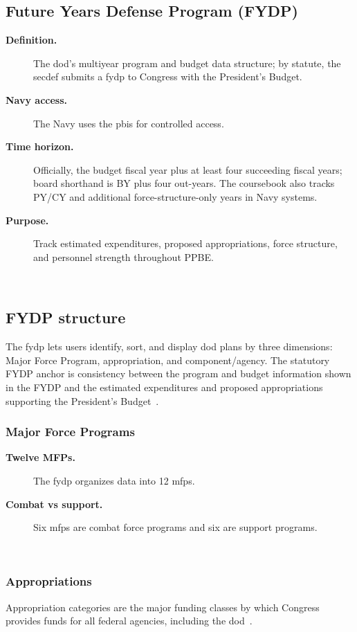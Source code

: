 \documentclass[../main.tex]{subfiles}
\begin{document}
\subsection{Future Years Defense Program (FYDP)}
\begin{description}
  \item[\textbf{Definition.}] The \ac{dod}'s multiyear program and budget data structure; by statute, the \ac{secdef} submits a \ac{fydp} to Congress with the President's Budget.
  \item[\textbf{Navy access.}] The Navy uses the \ac{pbis} for controlled access.
  \item[\textbf{Time horizon.}] Officially, the budget fiscal year plus at least four succeeding fiscal years; board shorthand is BY plus four out-years. The coursebook also tracks PY/CY and additional force-structure-only years in Navy systems.
  \item[\textbf{Purpose.}] Track estimated expenditures, proposed appropriations, force structure, and personnel strength throughout PPBE.
\end{description}
~

\subsection{FYDP structure}
The \ac{fydp} lets users identify, sort, and display \ac{dod} plans by three dimensions: Major Force Program, appropriation, and component/agency. The statutory FYDP anchor is consistency between the program and budget information shown in the FYDP and the estimated expenditures and proposed appropriations supporting the President's Budget~\autocite{edo-3-1-1-ppbe-2025,USC-221-FYDP,USC-1105-Federal-Budget}.

\subsubsection{Major Force Programs}
\begin{description}
  \item[\textbf{Twelve MFPs.}] The \ac{fydp} organizes data into 12 \acp{mfp}.
  \item[\textbf{Combat vs support.}] Six \acp{mfp} are combat force programs and six are support programs.
\end{description}
~

\subsubsection{Appropriations}
Appropriation categories are the major funding classes by which Congress provides funds for all federal agencies, including the \ac{dod}~\autocite{edo-3-1-1-ppbe-2025}.
\end{document}
